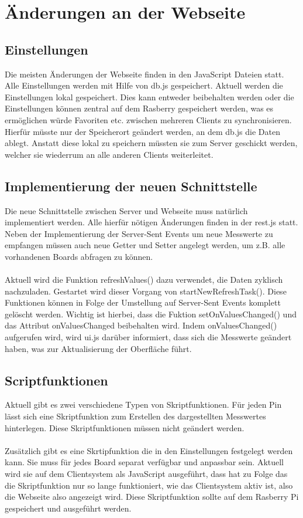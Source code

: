 \section{Änderungen an der Webseite}
\subsection{Einstellungen}
Die meisten Änderungen der Webseite finden in den JavaScript Dateien statt. Alle
Einstellungen werden mit Hilfe von \textrm{db.js} gespeichert. Aktuell werden
die Einstellungen lokal gespeichert. Dies kann entweder beibehalten werden oder
die Einstellungen können zentral auf dem Rasberry gespeichert werden, was es
ermöglichen würde Favoriten etc. zwischen mehreren Clients zu synchronisieren.
Hierfür müsste nur der Speicherort geändert werden, an dem \textrm{db.js} die
Daten ablegt. Anstatt diese lokal zu speichern müssten sie zum Server geschickt
werden, welcher sie wiederrum an alle anderen Clients weiterleitet.

\subsection{Implementierung der neuen Schnittstelle}
Die neue Schnittstelle zwischen Server und Webseite muss natürlich implementiert
werden. Alle hierfür nötigen Änderungen finden in der \textrm{rest.js} statt.
Neben der Implementierung der Server-Sent Events um neue Messwerte zu
empfangen müssen auch neue Getter und Setter angelegt werden, um z.B. alle
vorhandenen Boards abfragen zu können.\\
\\
Aktuell wird die Funktion \textrm{refreshValues()} dazu verwendet, die Daten
zyklisch nachzuladen. Gestartet wird dieser Vorgang von 
\textrm{startNewRefreshTask()}. Diese Funktionen können in Folge der Umstellung
auf Server-Sent Events komplett gelöscht werden. Wichtig ist hierbei, dass die
Fuktion \textrm{setOnValuesChanged()} und das Attribut
\textrm{onValuesChanged} beibehalten wird. Indem \textrm{onValuesChanged()}
aufgerufen wird, wird \textrm{ui.js} darüber informiert, dass sich die Messwerte
geändert haben, was zur Aktualisierung der Oberfläche führt.

\subsection{Scriptfunktionen}
Aktuell gibt es zwei verschiedene Typen von Skriptfunktionen. Für jeden Pin
lässt sich eine Skriptfunktion zum Erstellen des dargestellten Messwertes
hinterlegen. Diese Skriptfunktionen müssen nicht geändert werden.\\
\\
Zusätzlich gibt es eine Skrtipfunktion die in den Einstellungen festgelegt
werden kann. Sie muss für jedes Board separat verfügbar und anpassbar sein.
Aktuell wird sie auf dem Clientsystem als JavaScript ausgeführt, dass hat zu
Folge das die Skriptfunktion nur so lange funktioniert, wie das Clientsystem
aktiv ist, also die Webseite also angezeigt wird. Diese Skriptfunktion sollte auf dem
Rasberry Pi gespeichert und ausgeführt werden.

